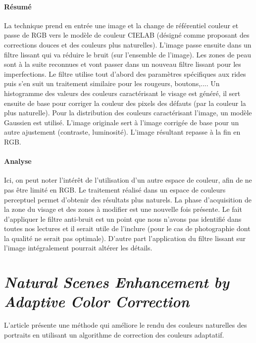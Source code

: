 \documentclass[11pt, french]{report-rd-info}
\begin{document}
\paragraph{Résumé}
La technique prend en entrée une image et la change de référentiel couleur et passe de RGB vers le modèle de couleur CIELAB (désigné comme proposant des corrections douces et des couleurs plus naturelles). L'image passe ensuite dans un filtre lissant qui va réduire le bruit (sur l’ensemble de l’image). Les zones de peau sont à la suite reconnues et vont passer dans un nouveau filtre lissant pour les imperfections. Le filtre utilise tout d'abord des paramètres spécifiques aux rides puis s'en suit un traitement similaire pour les rougeurs, boutons,.... Un histogramme des valeurs des couleurs caractérisant le visage est généré, il sert ensuite de base pour corriger la couleur des pixels des défauts (par la couleur la plus naturelle). Pour la distribution des couleurs caractérisant l'image, un modèle Gaussien est utilisé. L’image originale sert à l'image corrigée de base pour un autre ajustement (contraste, luminosité). L'image résultant repasse à la fin en RGB.

\paragraph{Analyse}
Ici, on peut noter l'intérêt de l'utilisation d'un autre espace de couleur, afin de ne pas être limité en RGB. Le traitement réalisé dans un espace de couleurs perceptuel permet d'obtenir des résultats plus naturels. La phase d'acquisition de la zone du visage et des zones à modifier est une nouvelle fois présente. Le fait d’appliquer le filtre anti-bruit est un point que nous n’avons pas identifié dans toutes nos lectures et il serait utile de l’inclure (pour le cas de photographie dont la qualité ne serait pas optimale). D’autre part l’application du filtre lissant sur l’image intégralement pourrait altérer les détails.


\section{\emph{Natural Scenes Enhancement by Adaptive Color Correction}}
L'article \cite{Naccari} présente une méthode qui améliore le rendu des couleurs naturelles des portraits en utilisant un algorithme de correction des couleurs adaptatif.
\end{document}
